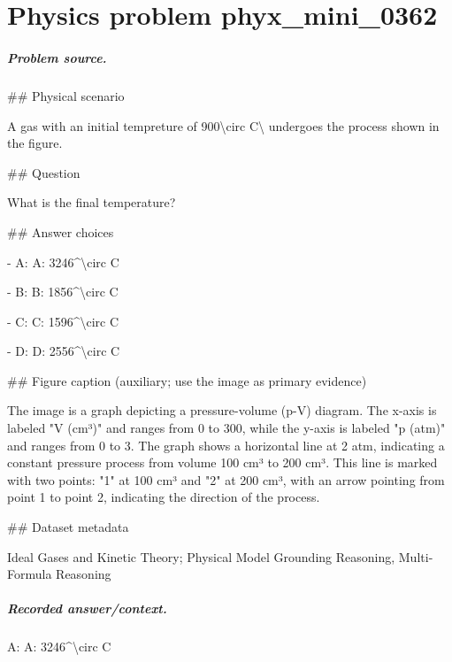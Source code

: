 
\chapter{Physics problem phyx\_mini\_0362}
\label{ch:PhyXMiniProblems_problem_phyx_mini_0362}

\paragraph{Problem source.}
\#\# Physical scenario

A gas with an initial tempreture of 900\textbackslash{}circ C\textbackslash{} undergoes the process shown in the figure.

\#\# Question

What is the final temperature?

\#\# Answer choices

- A: A: 3246\textasciicircum{}\textbackslash{}circ C

- B: B: 1856\textasciicircum{}\textbackslash{}circ C

- C: C: 1596\textasciicircum{}\textbackslash{}circ C

- D: D: 2556\textasciicircum{}\textbackslash{}circ C

\#\# Figure caption (auxiliary; use the image as primary evidence)

The image is a graph depicting a pressure-volume (p-V) diagram. The x-axis is labeled "V (cm³)" and ranges from 0 to 300, while the y-axis is labeled "p (atm)" and ranges from 0 to 3. The graph shows a horizontal line at 2 atm, indicating a constant pressure process from volume 100 cm³ to 200 cm³. This line is marked with two points: "1" at 100 cm³ and "2" at 200 cm³, with an arrow pointing from point 1 to point 2, indicating the direction of the process.

\#\# Dataset metadata

Ideal Gases and Kinetic Theory; Physical Model Grounding Reasoning, Multi-Formula Reasoning

\paragraph{Recorded answer/context.}
A: A: 3246\textasciicircum{}\textbackslash{}circ C

